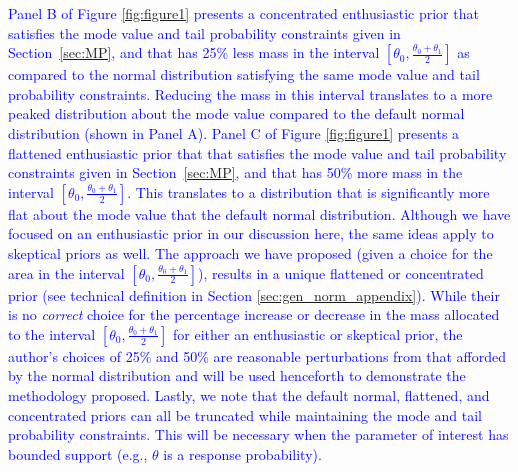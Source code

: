 \documentclass[useAMS,usenatbib,referee]{biom}
\begin{document}
\textcolor{blue}{
Panel B of Figure \ref{fig:figure1} presents a concentrated enthusiastic prior that satisfies 
the mode value and tail probability constraints given in Section~\ref{sec:MP}, and that has 25\% less mass in the interval 
$\left[\theta_0, \tfrac{\theta_0+\theta_1}{2}\right]$ as compared to the normal distribution satisfying the same mode value and tail probability constraints. 
Reducing the mass in this interval translates to a more peaked distribution about the mode value compared to the default normal distribution (shown in Panel A). 
%
Panel C of Figure \ref{fig:figure1} presents a flattened enthusiastic prior that that satisfies the mode value and tail probability constraints given in Section~\ref{sec:MP}, and
that has 50\% more mass in the interval $\left[\theta_0, \tfrac{\theta_0+\theta_1}{2}\right]$. This translates to a distribution that is significantly more flat about the mode value
that the default normal distribution. 
%
Although we have focused on an enthusiastic prior in our discussion here, the same ideas apply to skeptical priors as well.
The approach we have proposed (given a choice for the area in the interval $\left[\theta_0, \tfrac{\theta_0+\theta_1}{2}\right]$), results in a unique 
flattened or concentrated prior (see technical definition in Section \ref{sec:gen_norm_appendix}).
While their is no \textit{correct} choice for the percentage increase or decrease in the mass allocated to the interval 
$\left[\theta_0, \tfrac{\theta_0+\theta_1}{2}\right]$ for either an enthusiastic or skeptical prior, the author's choices
of 25\% and 50\% are reasonable perturbations from that afforded by the normal distribution and will be used henceforth to 
demonstrate the methodology proposed. 
Lastly, we note that the default normal, flattened, and concentrated priors can all be truncated while maintaining the mode and tail 
probability constraints.
This will be necessary when the parameter of interest has bounded support (e.g., $\theta$ is a response probability).
}
\end{document}
